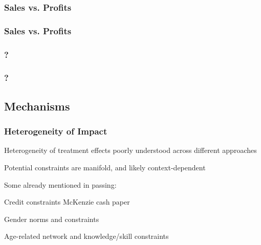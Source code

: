 \documentclass[hideothersubsections, usenames,dvipsnames,11pt]{beamer}
\newenvironment{itemize_2pt}{\itemize\addtolength{\itemsep}{2pt}}{\enditemize}
\begin{document}

\begin{frame}
\frametitle{Sales vs. Profits}
	\begin{itemize_2pt}
	\item  \citep{deMel2009}
	\vspace{0.1in}
	\end{itemize_2pt}
\end{frame}

\begin{frame}
\frametitle{Sales vs. Profits}
	\begin{itemize_2pt}
	\item \citep{deMel2009}
	\vspace{0.1in}
	\end{itemize_2pt}
\end{frame}


\begin{frame}
\frametitle{?}
	\begin{itemize_2pt}
	\item 
	\vspace{0.1in}
	\end{itemize_2pt}
\end{frame}

\begin{frame}
\frametitle{?}
	\begin{itemize_2pt}
	\item 
	\vspace{0.1in}
	\end{itemize_2pt}
\end{frame}


\subsection{Mechanisms}

\begin{frame}
\frametitle{Heterogeneity of Impact}
	\begin{itemize_2pt}
	\item Heterogeneity of treatment effects poorly understood across different approaches
	\item Potential constraints are manifold, and likely context-dependent
	\item Some already mentioned in passing:
	\begin{itemize_2pt}
		\item Credit constraints \citep[see, e.g.,][]{} McKenzie cash paper
		\item Gender norms and constraints
		\item Age-related network and knowledge/skill constraints
	\end{itemize_2pt} 
	\vspace{0.1in}
	\end{itemize_2pt}
\end{frame}
\end{document}
